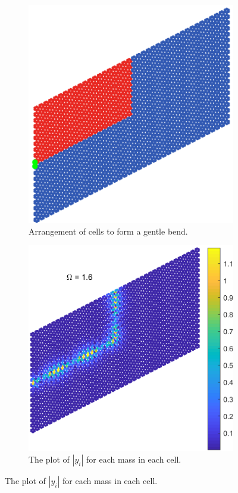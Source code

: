 \begin{figure}
\centering
\begin{subfigure}[b]{.5\textwidth}
  \centering
  \includegraphics[width=0.8\linewidth]{imgs/gentlebendarr.png}
  \caption{Arrangement of cells to form a gentle bend.}
  \label{fig:sub1}
\end{subfigure}%
\begin{subfigure}[b]{.5\textwidth}
  \centering
  \includegraphics[width=1\linewidth]{imgs/gentlebendscat.png}
  \caption{The plot of $|y_i|$ for each mass in each cell.}
  \label{fig:sub2}
\end{subfigure}


\end{figure}
